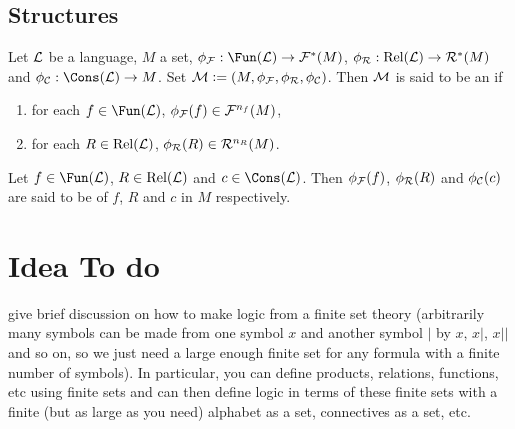 \documentclass{book}
\begin{document}
	
	
	
	
	
	
	
	
	
	
	
	
	
	
	
	
	







	\section{Structures}
	
	\begin{defn}
		Let $\mathcal{L}$ be a language, $M$ a set, $\phi_{\MF}: \Fun(\ML) \rightarrow \MF^*(M)$, $\phi_{\mathcal{R}}: \text{Rel}(\mathcal{L}) \rightarrow \mathcal{R}^*(M)$ and $\phi_{\MC}: \Cons(\ML) \rightarrow M$. Set $\mathcal{M} \vcentcolon= (M, \phi_{\mathcal{F}}, \phi_{\mathcal{R}}, \phi_{\mathcal{C}})$. Then $\mathcal{M}$ is said to be an  if 
		\begin{enumerate}
			\item for each $f \in \Fun(\ML)$, $\phi_{\mathcal{F}}(f) \in \mathcal{F}^{n_f}(M)$,
			\item for each $R \in \text{Rel}(\mathcal{L})$, $\phi_{\mathcal{R}}(R) \in \mathcal{R}^{n_R}(M)$.
		\end{enumerate}
		Let $f \in \Fun(\ML)$, $R \in \text{Rel}(\mathcal{L})$ and $c \in \Cons(\ML)$. Then $\phi_{\mathcal{F}}(f)$, $\phi_{\mathcal{R}}(R)$ and $\phi_{\mathcal{C}}(c)$ are said to be  of $f$, $R$ and $c$ in $M$ respectively.
	\end{defn}
	
	
	
	
	
	
	
	
	
	
	
	
	
	
	
	
	
	
	
	
	
	
	
	
	
	
	\newpage
	\chapter{Idea To do}
	
	give brief discussion on how to make logic from a finite set theory (arbitrarily many symbols can be made from one symbol $x$ and another symbol $|$ by $x$, $x|$, $x||$ and so on, so we just need a large enough finite set for any formula with a finite number of symbols). In particular, you can define products, relations, functions, etc using finite sets and can then define logic in terms of these finite sets with a finite (but as large as you need) alphabet as a set, connectives as a set, etc.  
	
\end{document}
